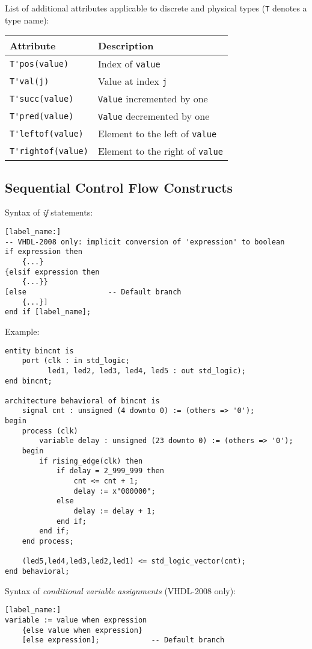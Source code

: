 \documentclass[fontsize=11pt,a4paper]{scrartcl}
\begin{document}
List of additional attributes applicable to discrete and physical types (\lstinline!T! denotes a type name):

\begin{tabular}{ll}
\toprule
	\textbf{Attribute} & \textbf{Description}\\
\midrule
	\lstinline!T'pos(value)! & Index of \lstinline!value!\\
	\lstinline!T'val(j)! & Value at index \lstinline!j!\\
	\lstinline!T'succ(value)! & \lstinline!Value! incremented by one\\
	\lstinline!T'pred(value)! & \lstinline!Value! decremented by one\\
	\lstinline!T'leftof(value)! & Element to the left of \lstinline!value!\\
	\lstinline!T'rightof(value)! & Element to the right of \lstinline!value!\\
\bottomrule
\end{tabular}
%
%
%
%
\subsection{Sequential Control Flow Constructs}
Syntax of \emph{if} statements:
\begin{lstlisting}
[label_name:]
-- VHDL-2008 only: implicit conversion of 'expression' to boolean
if expression then
	{...}
{elsif expression then
	{...}}
[else                   -- Default branch
	{...}]
end if [label_name];
\end{lstlisting}

Example:
\begin{lstlisting}
entity bincnt is
	port (clk : in std_logic;
	      led1, led2, led3, led4, led5 : out std_logic);
end bincnt;

architecture behavioral of bincnt is
	signal cnt : unsigned (4 downto 0) := (others => '0');
begin
	process (clk)
		variable delay : unsigned (23 downto 0) := (others => '0');
	begin
		if rising_edge(clk) then
			if delay = 2_999_999 then
				cnt <= cnt + 1;
				delay := x"000000";
			else
				delay := delay + 1;
			end if;
		end if;
	end process;

	(led5,led4,led3,led2,led1) <= std_logic_vector(cnt);
end behavioral;
\end{lstlisting}

Syntax of \emph{conditional variable assignments} (VHDL-2008 only):
\begin{lstlisting}
[label_name:]
variable := value when expression
	{else value when expression}
	[else expression];            -- Default branch
\end{lstlisting}
\end{document}
